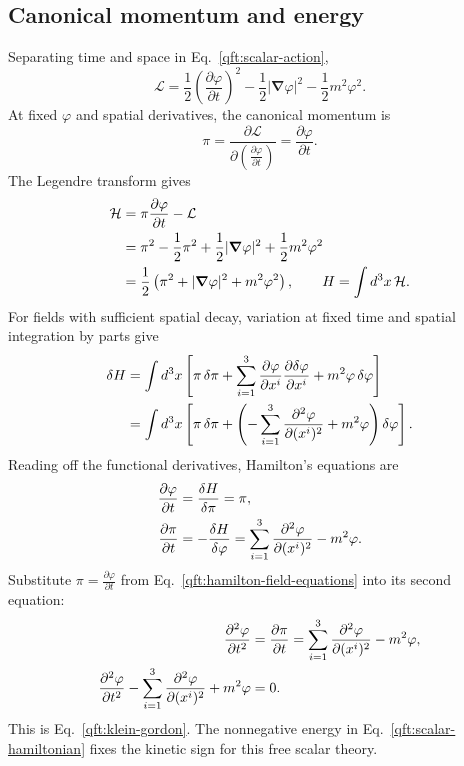 \subsection{Canonical momentum and energy}
Separating time and space in Eq.~\eqref{qft:scalar-action},
\begin{equation}\label{qft:scalar-lagrangian-time}
 \mathcal L=\frac12\left(\frac{\partial\varphi}{\partial t}\right)^2
 -\frac12|\boldsymbol\nabla\varphi|^2-\frac12m^2\varphi^2 .
\end{equation}
At fixed $\varphi$ and spatial derivatives, the canonical momentum is
\begin{equation}\label{qft:canonical-momentum}
 \pi=\frac{\partial\mathcal L}
 {\partial(\frac{\partial\varphi}{\partial t})}
 =\frac{\partial\varphi}{\partial t}.
\end{equation}
The Legendre transform gives
\begin{align}
 \mathcal H
 &=\pi\frac{\partial\varphi}{\partial t}-\mathcal L\notag\\
 &=\pi^2-\frac12\pi^2
   +\frac12|\boldsymbol\nabla\varphi|^2+\frac12m^2\varphi^2\notag\\
 &=\frac12\left(\pi^2+|\boldsymbol\nabla\varphi|^2+m^2\varphi^2\right),
 \qquad H=\int d^3x\,\mathcal H .\label{qft:scalar-hamiltonian}
\end{align}
For fields with sufficient spatial decay, variation at fixed time and
spatial integration by parts give
\begin{align}
 \delta H&=\int d^3x\left[
 \pi\,\delta\pi+
 \sum_{i=1}^3\frac{\partial\varphi}{\partial x^i}
 \frac{\partial\delta\varphi}{\partial x^i}+m^2\varphi\,\delta\varphi
 \right]\notag\\
 &=\int d^3x\left[
 \pi\,\delta\pi+
 \left(-\sum_{i=1}^3\frac{\partial^2\varphi}{\partial(x^i)^2}
 +m^2\varphi\right)\delta\varphi\right].
 \label{qft:hamiltonian-variation}
\end{align}
Reading off the functional derivatives, Hamilton's equations are
\begin{align}
 \frac{\partial\varphi}{\partial t}
 &=\frac{\delta H}{\delta\pi}=\pi,\notag\\
 \frac{\partial\pi}{\partial t}
 &=-\frac{\delta H}{\delta\varphi}
 =\sum_{i=1}^3\frac{\partial^2\varphi}{\partial(x^i)^2}-m^2\varphi.
 \label{qft:hamilton-field-equations}
\end{align}
Substitute $\pi=\frac{\partial\varphi}{\partial t}$ from
Eq.~\eqref{qft:hamilton-field-equations} into its second equation:
\begin{align}
 \frac{\partial^2\varphi}{\partial t^2}
 &=\frac{\partial\pi}{\partial t}
  =\sum_{i=1}^3\frac{\partial^2\varphi}{\partial(x^i)^2}-m^2\varphi,
  \notag\\
 \frac{\partial^2\varphi}{\partial t^2}
  -\sum_{i=1}^3\frac{\partial^2\varphi}{\partial(x^i)^2}
  +m^2\varphi&=0.
 \label{qft:hamilton-to-klein-gordon}
\end{align}
This is Eq.~\eqref{qft:klein-gordon}. The nonnegative energy in
Eq.~\eqref{qft:scalar-hamiltonian} fixes the kinetic sign for this free
scalar theory.

